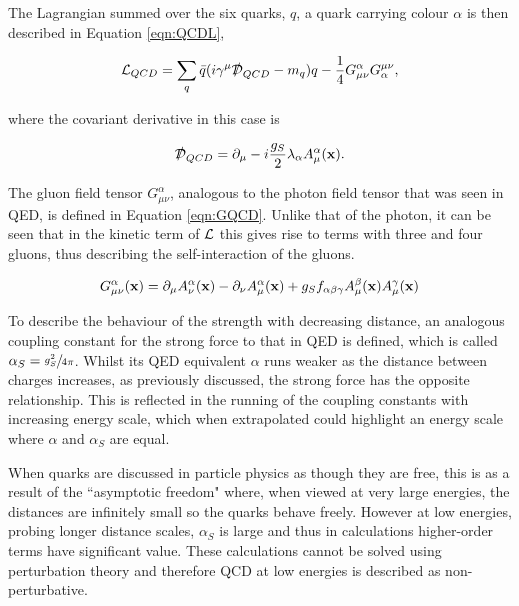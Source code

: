 The Lagrangian summed over the six quarks, $q$, a quark carrying colour $\alpha$ is then described in Equation \ref{eqn:QCDL},

\begin{equation}
{\mathcal{L}}_{QCD} = \sum_{q} \bar{q}(i \gamma^{\mu}\slashed{\mathcal{D}}_{QCD} - m_{q}) q - \frac{1}{4}G^{\alpha}_{\mu \nu}G^{\mu \nu}_{\alpha},
\label{eqn:QCDL}
\end{equation}

where the covariant derivative in this case is


\begin{equation}
\slashed{\Dev}_{QCD} = \partial_{\mu} - i\frac{g_{S}}{2}\lambda_{\alpha}A^{\alpha}_{\mu}(\stc).
\label{eqn:QCDD}
\end{equation}

The gluon field tensor $G^{\alpha}_{\mu \nu}$, analogous to the photon field tensor that was seen in QED, is defined in Equation \ref{eqn:GQCD}. Unlike that of the photon, it can be seen that in the kinetic term of ${\mathcal{L}}$ this gives rise to terms with three and four gluons, thus describing the self-interaction of the gluons. 

\begin{equation}
G^{\alpha}_{\mu \nu} (\mathbf{x}) = \partial_{\mu} A^{\alpha}_{\nu} (\mathbf{x}) - \partial_{\nu}A^{\alpha}_{\mu}(\mathbf{x}) + g_{S} f_{\alpha \beta \gamma} A^{\beta}_{\mu}(\mathbf{x})A^{\gamma}_{\mu}(\mathbf{x})
\label{eqn:GQCD}
\end{equation}



 To describe the behaviour of the strength with decreasing distance, an analogous coupling constant for the strong force to that in QED is defined, which is called $\alpha_{S} = \sfrac{g_{S}^{2}}{4\pi}$. Whilst its QED equivalent $\alpha$ runs weaker as the distance between charges increases, as previously discussed, the strong force has the opposite relationship. This is reflected in the running of the coupling constants with increasing energy scale, which when extrapolated could highlight an energy scale where $\alpha$ and $\alpha_{S}$ are equal. 
 
 When quarks are discussed in particle physics as though they are free, this is as a result of the ``asymptotic freedom" where, when viewed at very large energies, the distances are infinitely small so the quarks behave freely. However at low energies, probing longer distance scales, $\alpha_{S}$ is large and thus in calculations higher-order terms have significant value. These calculations cannot be solved using perturbation theory and therefore QCD at low energies is described as non-perturbative.  
 
